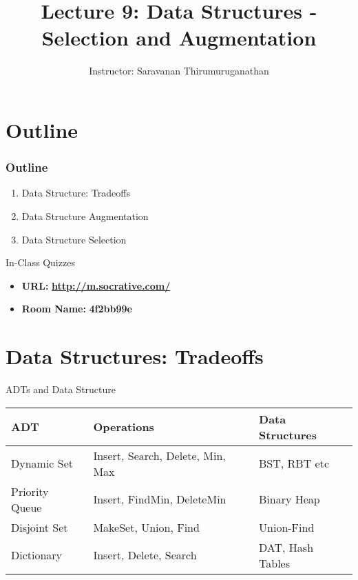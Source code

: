 \documentclass{beamer}
\title[Saravanan Thirumuruganathan] 
{Lecture 9: Data Structures - Selection and Augmentation}
\author[CSE 5311] 
{Instructor: Saravanan Thirumuruganathan}
\date[]
\begin{document}
\begin{frame}
  \titlepage
\end{frame}


\section{Outline}

\begin{frame}
\frametitle {Outline}
\begin{enumerate}
\item Data Structure: Tradeoffs 
\item Data Structure Augmentation
\item Data Structure Selection 
\end{enumerate}
\end{frame}

\begin{frame}{In-Class Quizzes}
\begin{itemize}
\item {\Large {\bf URL:}} {\LARGE \bf \url{http://m.socrative.com/}} 
\item {\Large {\bf Room Name:} {\LARGE \bf 4f2bb99e}}
\end{itemize}
\end{frame}

\section{Data Structures: Tradeoffs}

\begin{frame}{ADTs and Data Structure}
    \begin{center}
    \begin{table}[h]
        \begin{tabular}{|l|l|l|}
            \hline
            {\bf ADT}            & {\bf Operations}                       & {\bf Data Structures} \\ \hline
            Dynamic Set    & Insert, Search, Delete, Min, Max & BST, RBT etc    \\ \hline
            Priority Queue & Insert, FindMin, DeleteMin       & Binary Heap     \\ \hline
            Disjoint Set   & MakeSet, Union, Find             & Union-Find      \\ \hline
            Dictionary     & Insert, Delete, Search           & DAT, Hash Tables \\ \hline               
        \end{tabular}
    \end{table}
    \end{center}
\end{frame}
\end{document}
